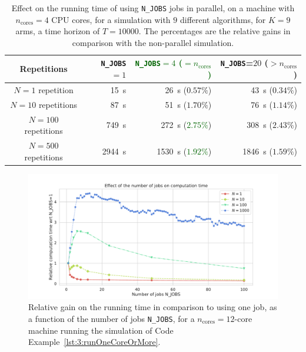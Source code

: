 \begin{table}[ht]
    \centering
    \begin{tabular}{c|rrr}
    \textbf{Repetitions} & \texttt{N\_JOBS}$=1$ & \textcolor{darkgreen}{\texttt{N\_JOBS}$=4$ ($= n_{\text{cores}}$)} & \texttt{N\_JOBS}=$20$ ($> n_{\text{cores}}$) \\
        \hline
        $N=1$ repetition    & \SI{15}{\second}
        & \SI{26}{\second} ($0.57 \%$)  %
        & \SI{43}{\second} ($0.34 \%$)  %
        \\
        $N=10$ repetitions  & \SI{87}{\second}
        & \SI{51}{\second} ($1.70 \%$)  %
        & \SI{76}{\second} ($1.14 \%$)  %
        \\
        $N=100$ repetitions & \SI{749}{\second}
        & \SI{272}{\second} (\textcolor{darkgreen}{$2.75 \%$})  %
        & \SI{308}{\second} ($2.43 \%$)  %
        \\
        $N=500$ repetitions & \SI{2944}{\second}
        & \SI{1530}{\second} (\textcolor{darkgreen}{$1.92 \%$})  %
        & \SI{1846}{\second} ($1.59 \%$)  %
        \\
    \end{tabular}
    \caption{Effect on the running time of using \texttt{N\_JOBS} jobs in parallel, on a machine with $n_{\text{cores}}=4$ CPU cores, for a simulation with $9$ different algorithms, for $K=9$ arms, a time horizon of $T=10000$. The percentages are the relative gains in comparison with the non-parallel simulation.}
    \label{table:3:speedUpTimeParallelComputations}
\end{table}


\begin{figure}[h!]  %
	\centering
	\includegraphics[width=1.10\linewidth]{analyze_speedup_as_nb_of_jobs_normalize.pdf}
	\caption{Relative gain on the running time in comparison to using one job, as a function of the number of jobs \texttt{N\_JOBS}, for a $n_{\text{cores}}=12$-core machine running the simulation of Code Example~\ref{lst:3:runOneCoreOrMore}.}
	\label{fig:3:analyze_speedup_as_nb_of_jobs}
\end{figure}

